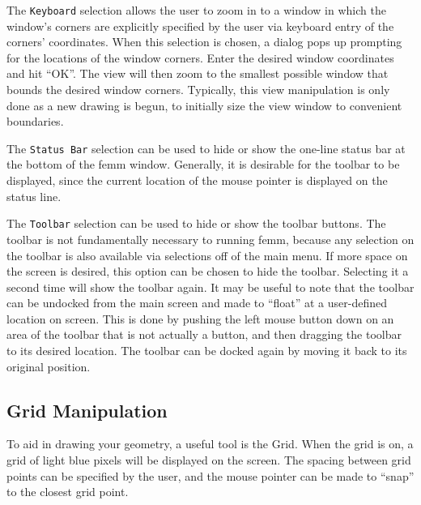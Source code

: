 \documentclass[12pt]{report}
\begin{document}
The {\tt Keyboard} selection allows the user to zoom in to a window
in which the window's corners are explicitly specified by the user
via keyboard entry of the corners' coordinates.  When this
selection is chosen, a dialog pops up prompting for the locations
of the window corners.  Enter the desired window coordinates and
hit ``OK''.  The view will then zoom to the smallest possible
window that bounds the desired window corners.  Typically, this
view manipulation is only done as a new drawing is begun, to
initially size the view window to convenient boundaries.

The {\tt Status Bar} selection can be used to hide or show the
one-line status bar at the bottom of the femm window.  Generally,
it is desirable for the toolbar to be displayed, since the current
location of the mouse pointer is displayed on the status line.

The {\tt Toolbar} selection can be used to hide or show the toolbar
buttons.  The toolbar is not fundamentally necessary to running
femm, because any selection on the toolbar is also available via
selections off of the main menu.  If more space on the screen is
desired, this option can be chosen to hide the toolbar.  Selecting
it a second time will show the toolbar again.  It may be useful to
note that the toolbar can be undocked from the main screen and made
to ``float'' at a user-defined location on screen.  This is done by
pushing the left mouse button down on an area of the toolbar that
is not actually a button, and then dragging the toolbar to its
desired location.  The toolbar can be docked again by moving it
back to its original position.

\subsection{Grid Manipulation} \label{grid_manipulation}

To aid in drawing your geometry, a useful tool is the Grid.  When
the grid is on, a grid of light blue pixels will be displayed on
the screen.  The spacing between grid points can be specified by
the user, and the mouse pointer can be made to ``snap'' to the
closest grid point.
\end{document}
